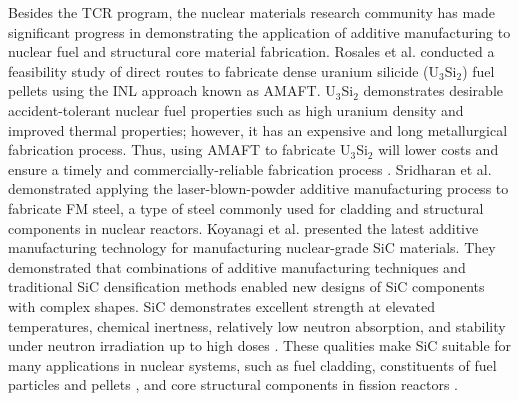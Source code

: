 Besides the \gls{TCR} program, the nuclear materials research community has made 
significant progress in demonstrating the application of additive manufacturing 
to nuclear fuel and structural core material fabrication. 
Rosales et al. \cite{rosales_characterizing_2019} conducted a feasibility study 
of direct routes to fabricate dense uranium silicide (U$_3$Si$_2$) fuel pellets 
using the \gls{INL} approach known as \gls{AMAFT}. 
U$_3$Si$_2$ demonstrates desirable accident-tolerant nuclear fuel properties 
such as high uranium density and improved thermal properties; however, it has 
an expensive and long metallurgical fabrication process. 
Thus, using \gls{AMAFT} to fabricate U$_3$Si$_2$ will lower costs and ensure a
timely and commercially-reliable fabrication process \cite{rosales_characterizing_2019}. 
Sridharan et al. \cite{sridharan_performance_2019} demonstrated applying
the laser-blown-powder additive manufacturing process to fabricate \gls{FM} steel, 
a type of steel commonly used for cladding and structural components in nuclear 
reactors. 
Koyanagi et al. \cite{koyanagi_additive_2020} presented the latest 
additive manufacturing technology for manufacturing nuclear-grade \gls{SiC} materials. 
They demonstrated that combinations of additive manufacturing techniques and 
traditional \gls{SiC} densification methods enabled new designs of \gls{SiC} 
components with complex shapes. 
\gls{SiC} demonstrates excellent strength at elevated temperatures, chemical inertness, 
relatively low neutron absorption, and stability under neutron irradiation up 
to high doses \cite{sauder_ceramic_2014, snead_handbook_2007,koyanagi_additive_2020}. 
These qualities make \gls{SiC} suitable for many applications in nuclear systems, 
such as fuel cladding, constituents of fuel particles \cite{snead_handbook_2007} 
and pellets \cite{terrani_progress_2015}, and core structural components in fission 
reactors \cite{sauder_ceramic_2014}. 




